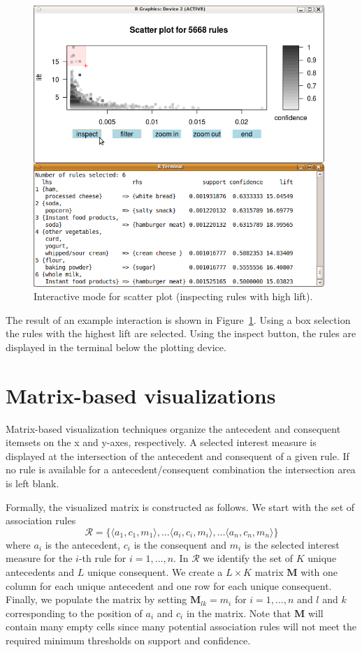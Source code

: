 \documentclass[nojss]{jss}
\newcommand{\set}[1]{\mathcal{#1}}
\newcommand{\mat}[1]{\mathbf{#1}}
\begin{document}
\begin{figure}
\centering
\includegraphics[width=11cm]{scatterplot_interactive.png}
\caption{Interactive mode for scatter plot (inspecting rules with
high lift).\label{fig:interaction}}
\end{figure}

The result of an
example interaction is shown in Figure~\ref{fig:interaction}.
Using a box selection the rules with the highest lift are selected. Using the
inspect button, the rules are displayed in the terminal below the plotting
device.

\section{Matrix-based visualizations}
\label{sec:matrix-based}
Matrix-based visualization techniques organize the
antecedent and consequent itemsets
on the x and y-axes, respectively. A selected interest measure
is displayed at the intersection of the antecedent and
consequent of a given rule. If no rule is available for a
antecedent/consequent combination the intersection area is left blank.

Formally, the visualized matrix is constructed as follows.
We start with the set of association rules
$$\set{R} = \{
    \langle a_1,c_1,m_1\rangle, \ldots
    \langle a_i,c_i,m_i\rangle, \ldots
    \langle a_n,c_n,m_n\rangle\}$$
where $a_i$ is the antecedent, $c_i$ is the consequent and $m_i$ is the
selected interest measure
for the $i$-th rule for $i = 1,\ldots,n$.
    In $\set{R}$ we identify the set of $K$ unique
antecedents and $L$ unique consequent. We create a $L \times K$ matrix
$\mat{M}$ with one column for each unique antecedent and one row for each
unique consequent.  Finally, we populate the matrix by setting
$\mat{M}_{lk} = m_i$ for $i=1,\ldots,n$ and $l$ and $k$ corresponding
to the position of $a_i$ and $c_i$ in the matrix.
Note that $\mat{M}$ will contain many empty cells since
many potential association rules
will not meet the required minimum thresholds on
support and confidence.
\end{document}
